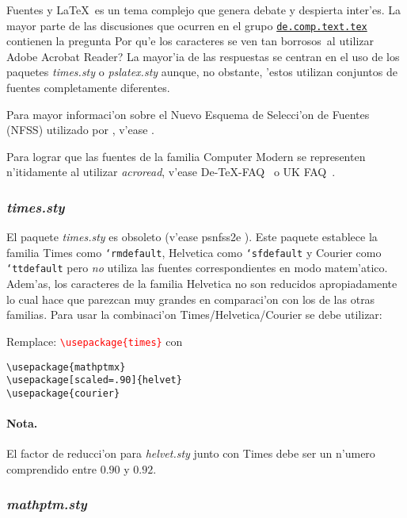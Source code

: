 \documentclass[11pt,a4paper,pagesize,tablecaptionabove,abstracton,pointlessnumbers]{scrartcl}
\newcommand{\News}[1]{\href{news:#1}{\texttt{#1}}}
\newcommand{\News}[1]{\href{news:#1}{\texttt{#1}}}
\newcommand{\gl}{\guillemotleft}
\newcommand{\gr}{\guillemotright}
\newcommand{\qd}{\textquestiondown}
\newcommand{\TB}{\textbackslash}
\newcommand{\Doku}[1]{\textsf{#1}\xspace}
\newcommand{\Paket}[1]{\textsf{\textsl{#1.sty}}\xspace}
\newcommand{\Use}[1]{\texttt{\textbackslash usepackage\{#1\}}}
\newcommand{\UseO}[2]{\texttt{\TB usepackage[#1]\{#2\}}}
\DeclareRobustCommand*{\Macro}[1]{\mbox{\texttt{\char`\\#1}}}
\newcommand{\Ersetze}[2]{\par\noindent Remplace: \textcolor{red}{#1}
  con \textcolor{gruen}{#2}}
\begin{document}
\gl Fuentes y \LaTeX\gr\ es un tema complejo que genera debate y despierta inter'es. La mayor parte de las discusiones  que ocurren en el grupo \News{de.comp.text.tex} contienen la pregunta \qd Por qu'e los caracteres se ven tan
\gl borrosos\gr\ al utilizar Adobe Acrobat\textsuperscript{\textregistered} Reader? La mayor'ia de las respuestas se centran en el uso de los paquetes \Paket{times} o \Paket{pslatex} aunque, no obstante, 'estos utilizan conjuntos de fuentes completamente diferentes.

Para mayor informaci'on sobre el Nuevo Esquema de Selecci'on de Fuentes (NFSS) utilizado por \LaTeXe, v'ease \cite{fntguide}.

Para lograr que las fuentes de la familia Computer Modern se representen n'itidamente al utilizar \emph{acroread}, v'ease \Doku{De-TeX-FAQ}~\cite[pregunta 9.2.3]{faq:02} o \Doku{UK FAQ}~\cite[\gl The wrong type of fonts in PDF\gr, pregunta 114]{ukfaq:99}.

\subsubsection{\Paket{times}}
\label{sec:pakettimes}

El paquete \Paket{times} es obsoleto (v'ease \Doku{psnfss2e} \cite{psnfss:02}). Este paquete establece la familia Times como \Macro{rmdefault}, Helvetica como \Macro{sfdefault} y Courier como \Macro{ttdefault} pero \emph{no} utiliza las fuentes correspondientes en modo matem'atico. Adem'as, los caracteres de la familia Helvetica no son reducidos apropiadamente lo cual hace que parezcan muy grandes en comparaci'on con los de las otras familias. Para usar la combinaci'on Times/\/Helvetica/\/Courier se debe utilizar:

\sbox{\Breite}{\UseO{scaled=.95}{helvet}} 
\Ersetze{\Use{times}}%
{\parbox[t]{\wd\Breite}{%
    \Use{mathptmx}\\
    \UseO{scaled=.90}{helvet}\\
    \Use{courier}}}

\paragraph{Nota.}
\label{sec:anmerkung-1}

El factor de reducci'on para \Paket{helvet} junto con Times debe ser un n'umero comprendido entre $0.90$ y $0.92$.

\subsubsection{\Paket{mathptm}}
\label{sec:mathptm}
\end{document}
